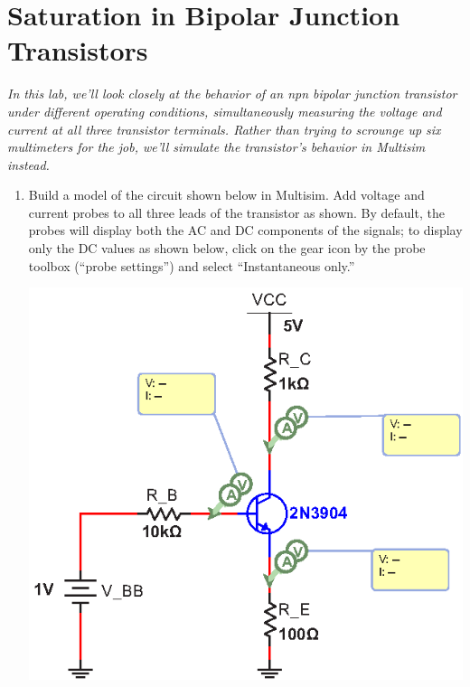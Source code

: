 \section{Saturation in  Bipolar Junction Transistors}
\label{lab_bjt_saturation}


\bigskip

\textit{In this lab, we'll look closely at the behavior of an npn bipolar junction transistor under different operating conditions, simultaneously measuring the voltage and current at all three transistor terminals.  Rather than trying to scrounge up six multimeters for the job, we'll simulate the transistor's behavior in Multisim instead.}

\begin{enumerate}[wide]

\item Build a model of the circuit shown below in Multisim.  Add voltage and current probes to all three leads of the transistor as shown.  By default, the probes will display both the AC and DC components of the signals; to display only the  DC values as shown below, click on the gear icon by the probe toolbox (``probe settings'') and select ``Instantaneous only.''  
\begin{center}
\includegraphics{bjt_saturation/bjt_saturation1.eps}
\end{center}


\end{enumerate}
